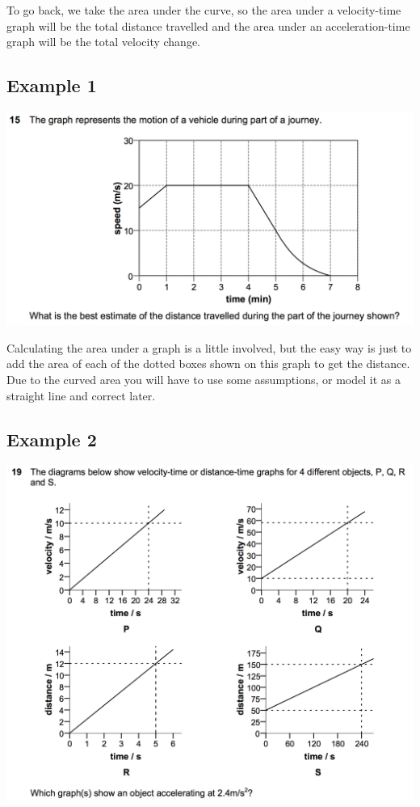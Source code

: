 \documentclass[11pt, titlepage]{article}
\begin{document}
To go back, we take the area under the curve, so the area under a velocity-time graph will be the total distance travelled and the area under an acceleration-time graph will be the total velocity change.

\subsection*{Example 1}

\includegraphics[width=\textwidth]{vt}

Calculating the area under a graph is a little involved, but the easy way is just to add the area of each of the dotted boxes shown on this graph to get the distance.  Due to the curved area you will have to use some assumptions, or model it as a straight line and correct later.

\subsection*{Example 2}

\includegraphics[width=\textwidth]{vt+dt}
\end{document}
